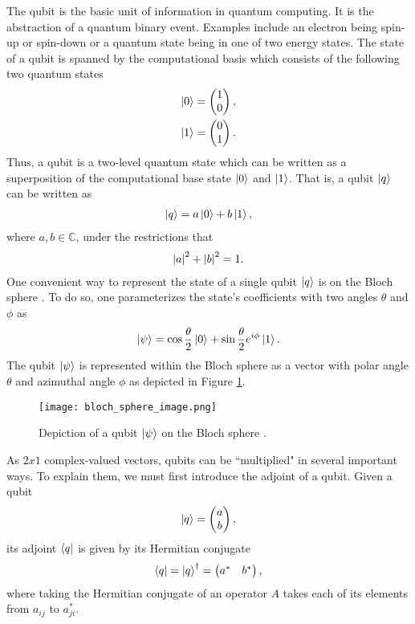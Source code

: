 \documentclass[Dual]{msu-thesis}
\begin{document}
The qubit is the basic unit of information in quantum computing. It is the abstraction of a quantum binary event. Examples include an electron being spin-up or spin-down or a quantum state being in one of two energy states. The state of a qubit is spanned by the computational basis which consists of the following two quantum states
\begin{align}
\ket{0}
&=
\begin{pmatrix}
1 \\ 0
\end{pmatrix},
\\
\ket{1}
&=
\begin{pmatrix}
0 \\ 1
\end{pmatrix}.
\end{align}
Thus, a qubit is a two-level quantum state which can be written as a superposition of the computational base state $\ket{0}$ and $\ket{1}$. That is, a qubit $\ket{q}$ can be written as
\begin{align}
\ket{q}=a\ket{0}+b\ket{1},
\end{align}
where $a,b\in\mathbb{C}$, under the restrictions that
\begin{align}
\abs{a}^2+\abs{b}^2=1.
\end{align}
One convenient way to represent the state of a single qubit $\ket{q}$ is on the Bloch sphere \cite{ref:bloch_sphere}. To do so, one parameterizes the state's coefficients with two angles $\theta$ and $\phi$ as
\begin{align}
\ket{\psi}=\cos\frac{\theta}{2}\ket{0}+\sin\frac{\theta}{2}e^{i\phi}\ket{1}
.\end{align}
The qubit $\ket{\psi}$ is represented within the Bloch sphere as a vector with polar angle $\theta$ and azimuthal angle $\phi$ as depicted in Figure \ref{fig:bloch_sphere}.

\begin{figure}
    \centering
    \texttt{[image: bloch\_sphere\_image.png]}   
    \caption{Depiction of a qubit $\ket{\psi}$ on the Bloch sphere \cite{ref:bloch_pic}.}
    \label{fig:bloch_sphere}
\end{figure}

As $2x1$ complex-valued vectors, qubits can be ``multiplied" in several important ways. To explain them, we must first introduce the adjoint of a qubit. Given a qubit
\begin{align}
\ket{q}
=
\begin{pmatrix}
a \\ b
\end{pmatrix}
,\end{align}
its adjoint $\bra{q}$ is given by its Hermitian  conjugate 
\begin{align}
\bra{q}
=
\ket{q}^\dagger
=
\begin{pmatrix}
a^* & b^*
\end{pmatrix}
,\end{align}
where taking the Hermitian conjugate of an operator $A$ takes each of its elements from $a_{ij}$ to $a^*_{ji}$.
\end{document}

